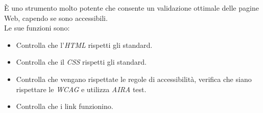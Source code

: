 È uno strumento molto potente che consente un validazione ottimale delle pagine Web, capendo se sono accessibili.\\
Le sue funzioni sono:
\begin{itemize}
	\item Controlla che l'\emph{HTML} rispetti gli standard.
	\item Controlla che il \emph{CSS} rispetti gli standard.
	\item Controlla che vengano rispettate le regole di accessibilità, verifica che siano rispettare le \emph{WCAG} e utilizza \emph{AIRA} test.
	\item Controlla che i link funzionino.
\end{itemize}